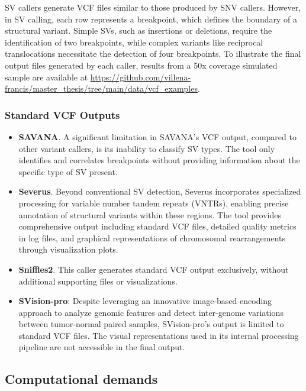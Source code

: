 SV callers generate VCF files similar to those produced by SNV callers. However, 
in SV calling, each row represents a breakpoint, which defines the boundary of a 
structural variant. Simple SVs, such as insertions or deletions, require the 
identification of two breakpoints, while complex variants like reciprocal 
translocations necessitate the detection of four breakpoints. To illustrate the 
final output files generated by each caller, results from a 50x coverage 
simulated sample are available at 
\url{https://github.com/villena-francis/master_thesis/tree/main/data/vcf_examples}.

\subsubsection{Standard VCF Outputs}

\begin{itemize}

\item \textbf{SAVANA}. A significant limitation in SAVANA's VCF output, compared 
to other variant callers, is its inability to classify SV types. The tool only 
identifies and correlates breakpoints without providing information about the 
specific type of SV present. 

\item \textbf{Severus}. Beyond conventional SV detection, 
Severus incorporates specialized processing for variable number tandem repeats 
(VNTRs), enabling precise annotation of structural variants within these regions. 
The tool provides comprehensive output including standard VCF files, detailed 
quality metrics in log files, and graphical representations of chromosomal 
rearrangements through visualization plots.

\item \textbf{Sniffles2}. This caller generates standard VCF output exclusively, 
without additional supporting files or visualizations.

\item \textbf{SVision-pro}: Despite leveraging an innovative image-based 
encoding approach to analyze genomic features and detect inter-genome variations 
between tumor-normal paired samples, SVision-pro's output is limited to standard 
VCF files. The visual representations used in its internal processing pipeline 
are not accessible in the final output.

\end{itemize}

\subsection{Computational demands}

